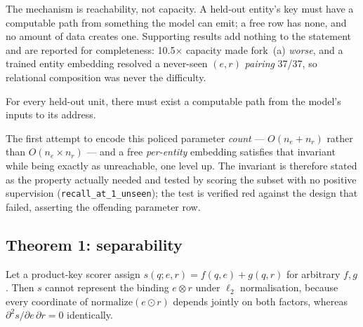 
The mechanism is reachability, not capacity. A held-out entity's key must have a computable path
from something the model can emit; a free row has none, and no amount of data creates one.
Supporting results add nothing to the statement and are reported for completeness: 10.5$\times$
capacity made fork~(a) \emph{worse}, and a trained entity embedding resolved a never-seen
$(e, r)$ \emph{pairing} 37/37, so relational composition was never the difficulty.

\begin{proposition}
\label{prop:reach}
For every held-out unit, there must exist a computable path from the model's inputs to its address.
\end{proposition}

\noindent The first attempt to encode this policed parameter \emph{count} --- $O(n_e + n_r)$ rather
than $O(n_e \times n_r)$ --- and a free \emph{per-entity} embedding satisfies that invariant while
being exactly as unreachable, one level up. The invariant is therefore stated as the property
actually needed and tested by scoring the subset with no positive supervision
(\texttt{recall\_at\_1\_unseen}); the test is verified red against the design that failed, asserting
the offending parameter row.

\subsection{Theorem 1: separability}

\begin{theorem}
\label{thm:sep}
Let a product-key scorer assign $s(q; e, r) = f(q, e) + g(q, r)$ for arbitrary $f, g$. Then $s$
cannot represent the binding $e \otimes r$ under $\ell_2$ normalisation, because every coordinate of
$\mathrm{normalize}(e \odot r)$ depends jointly on both factors, whereas $\partial^2 s / \partial e\,
\partial r = 0$ identically.
\end{theorem}

